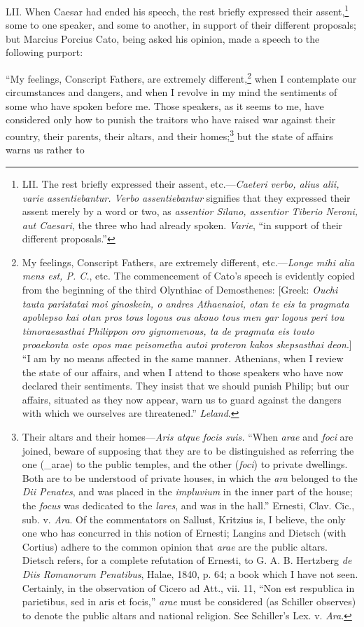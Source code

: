 LII. When Caesar had ended his speech, the rest briefly expressed
their assent,\footnote{LII. The rest briefly expressed their assent, etc.—\emph{Caeteri
verbo, alius alii, varie assentiebantur. Verbo assentiebantur}
signifies that they expressed their assent merely by a word or two,
as \emph{assentior Silano, assentior Tiberio Neroni, aut Caesari}, the
three who had already spoken. \emph{Varie}, ``in support of their different
proposals.''} some to one speaker, and some to another, in
support of their different proposals; but Marcius Porcius Cato, being
asked his opinion, made a speech to the following purport:

``My feelings, Conscript Fathers, are extremely different,\footnote{My feelings, Conscript Fathers, are extremely different,
etc.—\emph{Longe mihi alia mens est, P. C.}, etc. The commencement of
Cato's speech is evidently copied from the beginning of the third
Olynthiac of Demosthenes: [Greek: \emph{Ouchi tauta paristatai moi
ginoskein, o andres Athaenaioi, otan te eis ta pragmata apoblepso kai
otan pros tous logous ous akouo tous men gar logous peri tou
timoraesasthai Philippon oro gignomenous, ta de pragmata eis touto
proaekonta oste opos mae peisometha autoi proteron kakos skepsasthai
deon}.] ``I am by no means affected in the same manner. Athenians, when
I review the state of our affairs, and when I attend to those speakers
who have now declared their sentiments. They insist that we should
punish Philip; but our affairs, situated as they now appear, warn us
to guard against the dangers with which we ourselves are threatened.''
\emph{Leland}.} when I
contemplate our circumstances and dangers, and when I revolve in my
mind the sentiments of some who have spoken before me. Those speakers,
as it seems to me, have considered only how to punish the traitors who
have raised war against their country, their parents, their altars,
and their homes;\footnote{Their altars and their homes—\emph{Aris atque focis suis.}
``When \emph{arae} and \emph{foci} are joined, beware of supposing that they are
to be distinguished as referring the one (\_arae) to the public
temples, and the other (\emph{foci}) to private dwellings. Both are to be
understood of private houses, in which the \emph{ara} belonged to the \emph{Dii
Penates}, and was placed in the \emph{impluvium} in the inner part of the
house; the \emph{focus} was dedicated to the \emph{lares}, and was in the hall.''
Ernesti, Clav. Cic., sub. v. \emph{Ara}. Of the commentators on Sallust,
Kritzius is, I believe, the only one who has concurred in this notion
of Ernesti; Langins and Dietsch (with Cortius) adhere to the common
opinion that \emph{arae} are the public altars. Dietsch refers, for a
complete refutation of Ernesti, to G. A. B. Hertzberg \emph{de Diis
Romanorum Penatibus}, Halae, 1840, p. 64; a book which I have not
seen. Certainly, in the observation of Cicero ad Att., vii. 11, ``Non
est respublica in parietibus, sed in aris et focis,'' \emph{arae} must be
considered (as Schiller observes) to denote the public altars and
national religion. See Schiller's Lex. v. \emph{Ara}.} but the state of affairs warns us rather to

